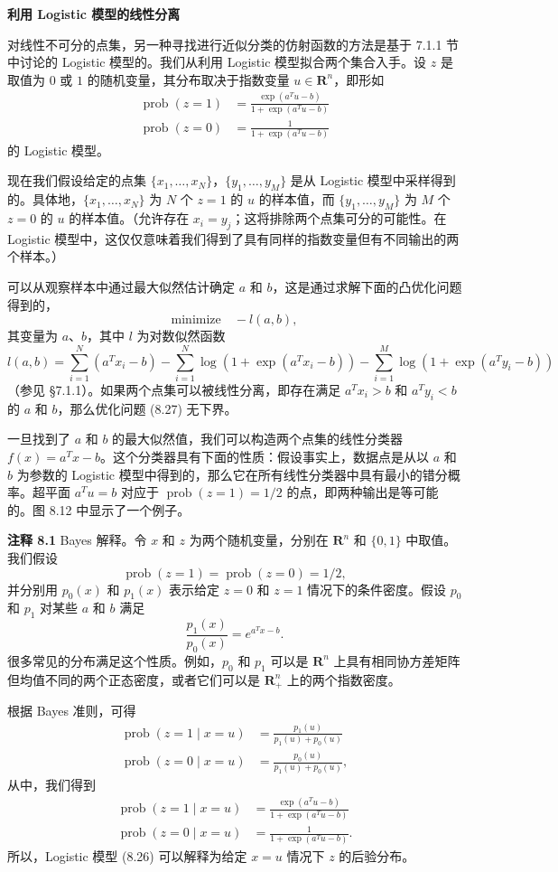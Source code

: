 \documentclass[UTF8, 12pt, fontset=fandol, oneside]{ctexart}
\begin{document}
\noindent\textbf{利用 Logistic 模型的线性分离}

对线性不可分的点集，另一种寻找进行近似分类的仿射函数的方法是基于 7.1.1 节中讨论的 Logistic 模型的。我们从利用 Logistic 模型拟合两个集合入手。设 $z$ 是取值为 $0$ 或 $1$ 的随机变量，其分布取决于指数变量 $u\in\mathbf{R}^n$，即形如
\[
\begin{split}
\operatorname{prob}(z=1)&=\frac{\exp(a^Tu-b)}{1+\exp(a^Tu-b)}\\
\operatorname{prob}(z=0)&=\frac{1}{1+\exp(a^Tu-b)}
\end{split}
\tag{8.26}
\]
的 Logistic 模型。

现在我们假设给定的点集 $\{x_1,\ldots,x_N\}$，$\{y_1,\ldots,y_M\}$ 是从 Logistic 模型中采样得到的。具体地，$\{x_1,\ldots,x_N\}$ 为 $N$ 个 $z=1$ 的 $u$ 的样本值，而 $\{y_1,\ldots,y_M\}$ 为 $M$ 个 $z=0$ 的 $u$ 的样本值。（允许存在 $x_i=y_j$；这将排除两个点集可分的可能性。在 Logistic 模型中，这仅仅意味着我们得到了具有同样的指数变量但有不同输出的两个样本。）

可以从观察样本中通过最大似然估计确定 $a$ 和 $b$，这是通过求解下面的凸优化问题得到的，
\[
\mbox{minimize}\quad -l(a,b),
\tag{8.27}
\]
其变量为 $a$、$b$，其中 $l$ 为对数似然函数
\[
l(a,b)=\sum_{i=1}^N(a^Tx_i-b)
-\sum_{i=1}^N\log(1+\exp(a^Tx_i-b))
-\sum_{i=1}^M\log(1+\exp(a^Ty_i-b))
\]
（参见 \S 7.1.1）。如果两个点集可以被线性分离，即存在满足 $a^Tx_i>b$ 和 $a^Ty_i<b$ 的 $a$ 和 $b$，那么优化问题 (8.27) 无下界。

一旦找到了 $a$ 和 $b$ 的最大似然值，我们可以构造两个点集的线性分类器 $f(x)=a^Tx-b$。这个分类器具有下面的性质：假设事实上，数据点是从以 $a$ 和 $b$ 为参数的 Logistic 模型中得到的，那么它在所有线性分类器中具有最小的错分概率。超平面 $a^Tu=b$ 对应于 $\operatorname{prob}(z=1)=1/2$ 的点，即两种输出是等可能的。图 8.12 中显示了一个例子。

\noindent\textbf{注释 8.1}\quad
Bayes 解释。令 $x$ 和 $z$ 为两个随机变量，分别在 $\mathbf{R}^n$ 和 $\{0,1\}$ 中取值。我们假设
\[
\operatorname{prob}(z=1)=\operatorname{prob}(z=0)=1/2,
\]
并分别用 $p_0(x)$ 和 $p_1(x)$ 表示给定 $z=0$ 和 $z=1$ 情况下的条件密度。假设 $p_0$ 和 $p_1$ 对某些 $a$ 和 $b$ 满足
\[
\frac{p_1(x)}{p_0(x)}=e^{a^Tx-b}.
\]
很多常见的分布满足这个性质。例如，$p_0$ 和 $p_1$ 可以是 $\mathbf{R}^n$ 上具有相同协方差矩阵但均值不同的两个正态密度，或者它们可以是 $\mathbf{R}_+^n$ 上的两个指数密度。

根据 Bayes 准则，可得
\[
\begin{split}
\operatorname{prob}(z=1\mid x=u)&=\frac{p_1(u)}{p_1(u)+p_0(u)}\\
\operatorname{prob}(z=0\mid x=u)&=\frac{p_0(u)}{p_1(u)+p_0(u)},
\end{split}
\]
从中，我们得到
\[
\begin{split}
\operatorname{prob}(z=1\mid x=u)&=\frac{\exp(a^Tu-b)}{1+\exp(a^Tu-b)}\\
\operatorname{prob}(z=0\mid x=u)&=\frac{1}{1+\exp(a^Tu-b)}.
\end{split}
\]
所以，Logistic 模型 (8.26) 可以解释为给定 $x=u$ 情况下 $z$ 的后验分布。
\end{document}
